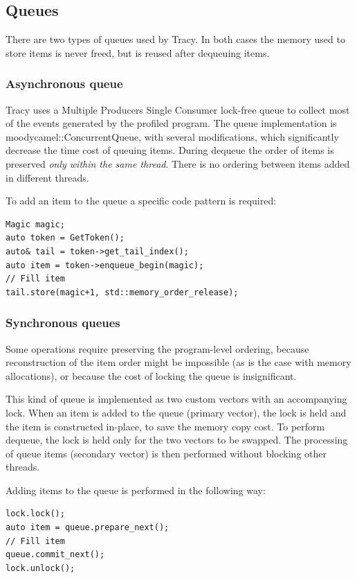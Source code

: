 \documentclass[hidelinks,titlepage,a4paper]{article}
\begin{document}
\subsection{Queues}

There are two types of queues used by Tracy. In both cases the memory used to store items is never freed, but is reused after dequeuing items.

\subsubsection{Asynchronous queue}

Tracy uses a Multiple Producers Single Consumer lock-free queue to collect most of the events generated by the profiled program. The queue implementation is moodycamel::ConcurrentQueue, with several modifications, which significantly decrease the time cost of queuing items. During dequeue the order of items is preserved \emph{only within the same thread}. There is no ordering between items added in different threads.

To add an item to the queue a specific code pattern is required:

\begin{lstlisting}
Magic magic;
auto token = GetToken();
auto& tail = token->get_tail_index();
auto item = token->enqueue_begin(magic);
// Fill item
tail.store(magic+1, std::memory_order_release);
\end{lstlisting}

\subsubsection{Synchronous queues}

Some operations require preserving the program-level ordering, because reconstruction of the item order might be impossible (as is the case with memory allocations), or because the cost of locking the queue is insignificant.

This kind of queue is implemented as two custom vectors with an accompanying lock. When an item is added to the queue (primary vector), the lock is held and the item is constructed in-place, to save the memory copy cost. To perform dequeue, the lock is held only for the two vectors to be swapped. The processing of queue items (secondary vector) is then performed without blocking other threads.

Adding items to the queue is performed in the following way:

\begin{lstlisting}
lock.lock();
auto item = queue.prepare_next();
// Fill item
queue.commit_next();
lock.unlock();
\end{lstlisting}
\end{document}

